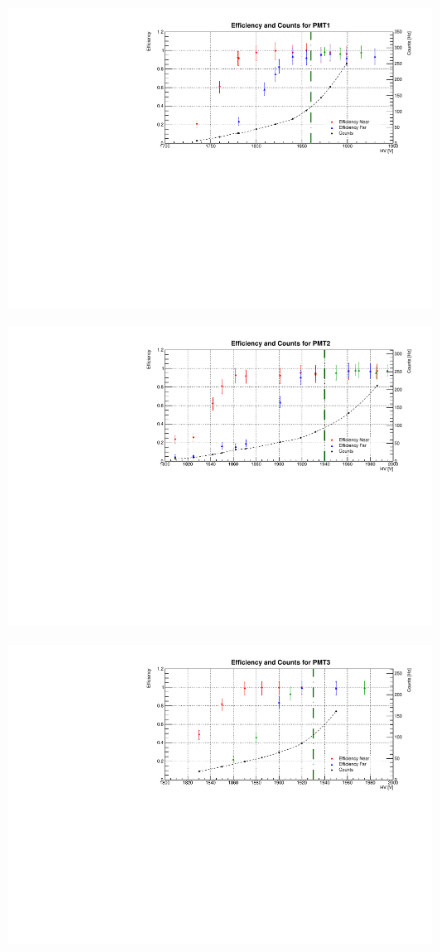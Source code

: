 \begin{figure}[h]
	\centerline{\includegraphics[scale=0.9]{img/eff/eff1.pdf}}
\end{figure}
\begin{figure}[h]
	\centerline{\includegraphics[scale=0.9]{img/eff/eff2.pdf}}	
\end{figure}
\begin{figure}[h]
	\centerline{\includegraphics[scale=0.9]{img/eff/eff3.pdf}}	
\end{figure}
